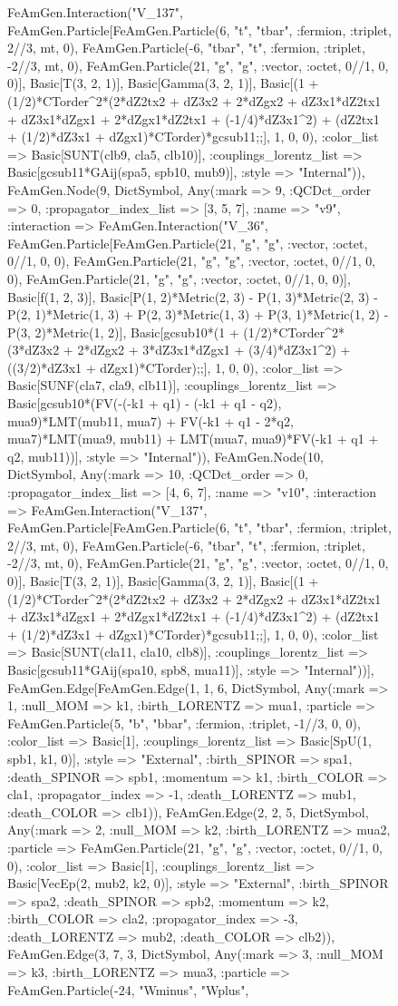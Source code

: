 \documentclass{revtex4}
\begin{document}
\begin{figure}[!htb]
\begin{center}
{FeAmGen.Interaction("V_137", FeAmGen.Particle[FeAmGen.Particle(6, "t", "tbar", :fermion, :triplet, 2//3, mt, 0), FeAmGen.Particle(-6, "tbar", "t", :fermion, :triplet, -2//3, mt, 0), FeAmGen.Particle(21, "g", "g", :vector, :octet, 0//1, 0, 0)], Basic[T(3, 2, 1)], Basic[Gamma(3, 2, 1)], Basic[(1 + (1/2)*CTorder^2*(2*dZ2tx2 + dZ3x2 + 2*dZgx2 + dZ3x1*dZ2tx1 + dZ3x1*dZgx1 + 2*dZgx1*dZ2tx1 + (-1/4)*dZ3x1^2) + (dZ2tx1 + (1/2)*dZ3x1 + dZgx1)*CTorder)*gcsub11;;], 1, 0, 0), :color_list => Basic[SUNT(clb9, cla5, clb10)], :couplings_lorentz_list => Basic[gcsub11*GAij(spa5, spb10, mub9)], :style => "Internal")), FeAmGen.Node(9, Dict{Symbol, Any}(:mark => 9, :QCDct_order => 0, :propagator_index_list => [3, 5, 7], :name => "v9", :interaction => FeAmGen.Interaction("V_36", FeAmGen.Particle[FeAmGen.Particle(21, "g", "g", :vector, :octet, 0//1, 0, 0), FeAmGen.Particle(21, "g", "g", :vector, :octet, 0//1, 0, 0), FeAmGen.Particle(21, "g", "g", :vector, :octet, 0//1, 0, 0)], Basic[f(1, 2, 3)], Basic[P(1, 2)*Metric(2, 3) - P(1, 3)*Metric(2, 3) - P(2, 1)*Metric(1, 3) + P(2, 3)*Metric(1, 3) + P(3, 1)*Metric(1, 2) - P(3, 2)*Metric(1, 2)], Basic[gcsub10*(1 + (1/2)*CTorder^2*(3*dZ3x2 + 2*dZgx2 + 3*dZ3x1*dZgx1 + (3/4)*dZ3x1^2) + ((3/2)*dZ3x1 + dZgx1)*CTorder);;], 1, 0, 0), :color_list => Basic[SUNF(cla7, cla9, clb11)], :couplings_lorentz_list => Basic[gcsub10*(FV(-(-k1 + q1) - (-k1 + q1 - q2), mua9)*LMT(mub11, mua7) + FV(-k1 + q1 - 2*q2, mua7)*LMT(mua9, mub11) + LMT(mua7, mua9)*FV(-k1 + q1 + q2, mub11))], :style => "Internal")), FeAmGen.Node(10, Dict{Symbol, Any}(:mark => 10, :QCDct_order => 0, :propagator_index_list => [4, 6, 7], :name => "v10", :interaction => FeAmGen.Interaction("V_137", FeAmGen.Particle[FeAmGen.Particle(6, "t", "tbar", :fermion, :triplet, 2//3, mt, 0), FeAmGen.Particle(-6, "tbar", "t", :fermion, :triplet, -2//3, mt, 0), FeAmGen.Particle(21, "g", "g", :vector, :octet, 0//1, 0, 0)], Basic[T(3, 2, 1)], Basic[Gamma(3, 2, 1)], Basic[(1 + (1/2)*CTorder^2*(2*dZ2tx2 + dZ3x2 + 2*dZgx2 + dZ3x1*dZ2tx1 + dZ3x1*dZgx1 + 2*dZgx1*dZ2tx1 + (-1/4)*dZ3x1^2) + (dZ2tx1 + (1/2)*dZ3x1 + dZgx1)*CTorder)*gcsub11;;], 1, 0, 0), :color_list => Basic[SUNT(cla11, cla10, clb8)], :couplings_lorentz_list => Basic[gcsub11*GAij(spa10, spb8, mua11)], :style => "Internal"))], FeAmGen.Edge[FeAmGen.Edge(1, 1, 6, Dict{Symbol, Any}(:mark => 1, :null_MOM => k1, :birth_LORENTZ => mua1, :particle => FeAmGen.Particle(5, "b", "bbar", :fermion, :triplet, -1//3, 0, 0), :color_list => Basic[1], :couplings_lorentz_list => Basic[SpU(1, spb1, k1, 0)], :style => "External", :birth_SPINOR => spa1, :death_SPINOR => spb1, :momentum => k1, :birth_COLOR => cla1, :propagator_index => -1, :death_LORENTZ => mub1, :death_COLOR => clb1)), FeAmGen.Edge(2, 2, 5, Dict{Symbol, Any}(:mark => 2, :null_MOM => k2, :birth_LORENTZ => mua2, :particle => FeAmGen.Particle(21, "g", "g", :vector, :octet, 0//1, 0, 0), :color_list => Basic[1], :couplings_lorentz_list => Basic[VecEp(2, mub2, k2, 0)], :style => "External", :birth_SPINOR => spa2, :death_SPINOR => spb2, :momentum => k2, :birth_COLOR => cla2, :propagator_index => -3, :death_LORENTZ => mub2, :death_COLOR => clb2)), FeAmGen.Edge(3, 7, 3, Dict{Symbol, Any}(:mark => 3, :null_MOM => k3, :birth_LORENTZ => mua3, :particle => FeAmGen.Particle(-24, "Wminus", "Wplus", }
\end{center}
\end{figure}
\end{document}
